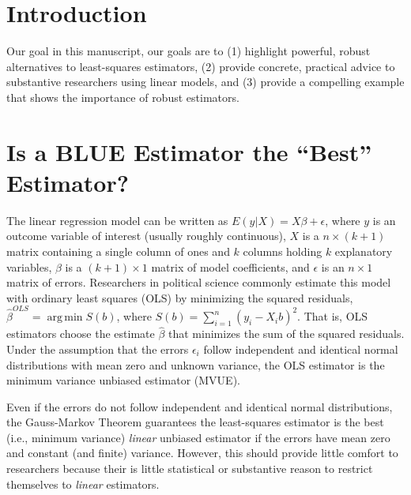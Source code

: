 \documentclass[10pt]{article}
\DeclareMathOperator*{\argmin}{arg\,min}
\begin{document}


\thispagestyle{empty}

\newpage
\doublespace

\section*{Introduction}

Our goal in this manuscript, our goals are to (1) highlight powerful, robust alternatives to least-squares estimators, (2) provide concrete, practical advice to substantive researchers using linear models, and (3) provide a compelling example that shows the importance of robust estimators.

\section*{Is a BLUE Estimator the ``Best'' Estimator?}

The linear regression model can be written as $E(y | X) = X\beta + \epsilon$, where $y$ is an outcome variable of interest (usually roughly continuous), $X$ is a $n \times (k + 1)$ matrix containing a single column of ones and $k$ columns holding $k$ explanatory variables, $\beta$ is a $(k + 1) \times 1$ matrix of model coefficients, and $\epsilon$ is an $n \times 1$ matrix of errors. Researchers in political science commonly estimate this model with ordinary least squares (OLS) by minimizing the squared residuals, $\hat{\beta}^{OLS} = \argmin S(b)$, where $S(b) = \sum_{i = 1}^n(y_i - X_ib)^2$. That is, OLS estimators choose the estimate $\hat{\beta}$ that minimizes the sum of the squared residuals. Under the assumption that the errors $\epsilon_i$ follow independent and identical normal distributions with mean zero and unknown variance, the OLS estimator is the minimum variance unbiased estimator (MVUE).

Even if the errors do not follow independent and identical normal distributions, the Gauss-Markov Theorem guarantees the least-squares estimator is the best (i.e., minimum variance) \textit{linear} unbiased estimator if the errors have mean zero and constant (and finite) variance. However, this should provide little comfort to researchers because their is little statistical or substantive reason to restrict themselves to \textit{linear} estimators.
\end{document}
